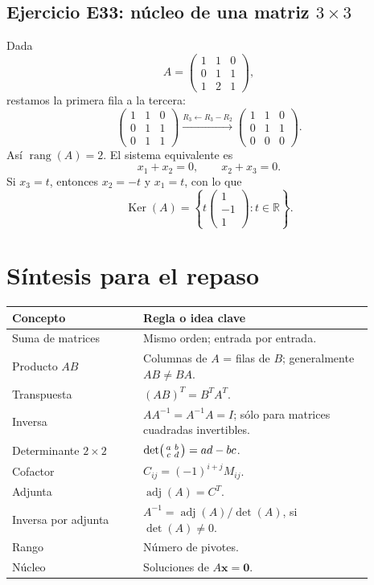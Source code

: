 \documentclass[12pt]{article}
\theoremstyle{remark}
\newcommand{\R}{\mathbb{R}}
\newcommand{\rang}{\operatorname{rang}}
\newcommand{\adj}{\operatorname{adj}}
\newcommand{\Ker}{\operatorname{Ker}}
\newcommand{\vect}[1]{\boldsymbol{#1}}
\begin{document}
\subsection*{Ejercicio E33: núcleo de una matriz $3\times3$}
Dada
\[
A=\begin{pmatrix}1&1&0\\0&1&1\\1&2&1\end{pmatrix},
\]
restamos la primera fila a la tercera:
\[
\begin{pmatrix}1&1&0\\0&1&1\\0&1&1\end{pmatrix}
\xrightarrow{R_3\leftarrow R_3-R_2}
\begin{pmatrix}1&1&0\\0&1&1\\0&0&0\end{pmatrix}.
\]
Así $\rang(A)=2$. El sistema equivalente es
\[
x_1+x_2=0,\qquad x_2+x_3=0.
\]
Si $x_3=t$, entonces $x_2=-t$ y $x_1=t$, con lo que
\[
\boxed{\Ker(A)=\left\{t\begin{pmatrix}1\\-1\\1\end{pmatrix}:t\in\R\right\}.}
\]

\section{Síntesis para el repaso}
\begin{center}
\renewcommand{\arraystretch}{1.35}
\begin{tabular}{>{\raggedright\arraybackslash}p{0.32\linewidth}>{\raggedright\arraybackslash}p{0.57\linewidth}}
\toprule
\textbf{Concepto} & \textbf{Regla o idea clave}\\\midrule
Suma de matrices & Mismo orden; entrada por entrada.\\
Producto $AB$ & Columnas de $A$ = filas de $B$; generalmente $AB\ne BA$.\\
Transpuesta & $(AB)^T=B^TA^T$.\\
Inversa & $AA^{-1}=A^{-1}A=I$; sólo para matrices cuadradas invertibles.\\
Determinante $2\times2$ & $\det\begin{psmallmatrix}a&b\\c&d\end{psmallmatrix}=ad-bc$.\\
Cofactor & $C_{ij}=(-1)^{i+j}M_{ij}$.\\
Adjunta & $\adj(A)=C^T$.\\
Inversa por adjunta & $A^{-1}=\adj(A)/\det(A)$, si $\det(A)\ne0$.\\
Rango & Número de pivotes.\\
Núcleo & Soluciones de $A\vect x=\vect0$.\\\bottomrule
\end{tabular}
\end{center}
\end{document}

